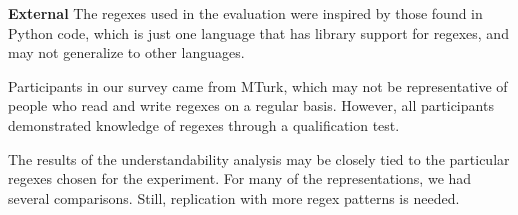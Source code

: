 \textbf{External}
The regexes  used in the evaluation were inspired by those found in Python code, which is just one language that has library support for regexes, and may not generalize to other languages.%

Participants in our survey came from MTurk, which may not be representative of people who read and write regexes on a regular basis. However, all participants demonstrated knowledge of regexes through a qualification test. 


The results of the understandability analysis may be closely tied to the particular regexes chosen for the experiment. For many of the representations, we had several comparisons. Still, replication with more regex patterns is needed.%


